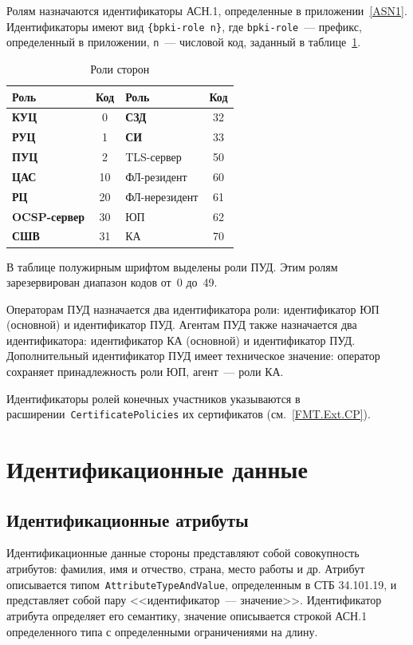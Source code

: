 Ролям назначаются идентификаторы АСН.1, определенные в приложении~\ref{ASN1}. 
Идентификаторы имеют вид \verb|{bpki-role n}|,
где \verb|bpki-role|~--- префикс, определенный в приложении,
\texttt{n}~--- числовой код, заданный в таблице~\ref{Table.ENTITIES.Roles}.

\begin{table}[H]
\caption{Роли сторон}
\label{Table.ENTITIES.Roles}
\begin{tabular}{|l|c||l|c|}
\hline
Роль & Код & Роль & Код\\
\hline
\hline
{\bf КУЦ}        & 0    & {\bf СЗД}      & 32 \\
{\bf РУЦ}        & 1    & {\bf СИ}       & 33 \\
{\bf ПУЦ}        & 2    & TLS-сервер     & 50 \\
{\bf ЦАС}        & 10   & ФЛ-резидент    & 60 \\
{\bf РЦ}         & 20   & ФЛ-нерезидент  & 61 \\
{\bf OCSP-сервер}& 30   & ЮП             & 62 \\
{\bf СШВ}        & 31   & КА             & 70 \\
\hline
\end{tabular}
\end{table}

В таблице полужирным шрифтом выделены роли ПУД.
Этим ролям зарезервирован диапазон кодов от~0 до~49.

Операторам ПУД назначается два идентификатора роли: 
идентификатор ЮП (основной) и идентификатор ПУД. 
%
Агентам ПУД также назначается два идентификатора: 
идентификатор КА (основной) и идентификатор ПУД. 
%
Дополнительный идентификатор ПУД имеет техническое значение:
оператор сохраняет принадлежность роли ЮП, агент~--- 
роли КА.

Идентификаторы ролей конечных участников указываются в 
расширении~\texttt{CertificatePolicies} их сертификатов
(см.~\ref{FMT.Ext.CP}).

\section{Идентификационные данные}\label{ENTITIES.Name}

\subsection{Идентификационные атрибуты}\label{ENTITIES.Attrs}

Идентификационные данные стороны представляют собой совокупность атрибутов: 
фамилия, имя и отчество, страна, место работы и др.  
%
Атрибут описывается типом~\texttt{AttributeTypeAndValue}, определенным в 
СТБ 34.101.19, и представляет собой пару <<идентификатор~--- значение>>. 
Идентификатор атрибута определяет его семантику, 
значение описывается строкой АСН.1 определенного типа с определенными 
ограничениями на длину.  

